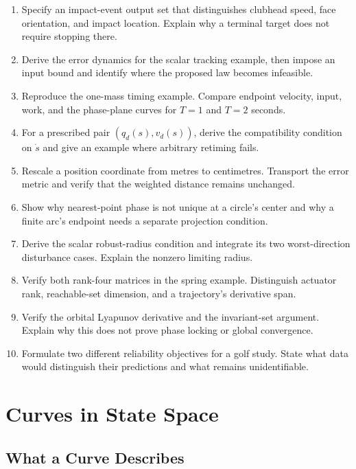 \documentclass[12pt, openany]{book}
\theoremstyle{plain}
\begin{document}
\begin{enumerate}
\item Specify an impact-event output set that distinguishes clubhead speed,
      face orientation, and impact location. Explain why a terminal target
      does not require stopping there.
\item Derive the error dynamics for the scalar tracking example, then impose
      an input bound and identify where the proposed law becomes infeasible.
\item Reproduce the one-mass timing example. Compare endpoint velocity, input,
      work, and the phase-plane curves for $T=1$ and $T=2$ seconds.
\item For a prescribed pair $(q_d(s),v_d(s))$, derive the compatibility condition
      on $\dot s$ and give an example where arbitrary retiming fails.
\item Rescale a position coordinate from metres to centimetres. Transport the
      error metric and verify that the weighted distance remains unchanged.
\item Show why nearest-point phase is not unique at a circle's center and why
      a finite arc's endpoint needs a separate projection condition.
\item Derive the scalar robust-radius condition and integrate its two
      worst-direction disturbance cases. Explain the nonzero limiting radius.
\item Verify both rank-four matrices in the spring example. Distinguish
      actuator rank, reachable-set dimension, and a trajectory's derivative span.
\item Verify the orbital Lyapunov derivative and the invariant-set argument.
      Explain why this does not prove phase locking or global convergence.
\item Formulate two different reliability objectives for a golf study. State
      what data would distinguish their predictions and what remains unidentifiable.
\end{enumerate}

\chapter{Curves in State Space}
\label{ch:curves_in_state_space}

\section{What a Curve Describes}
\end{document}
